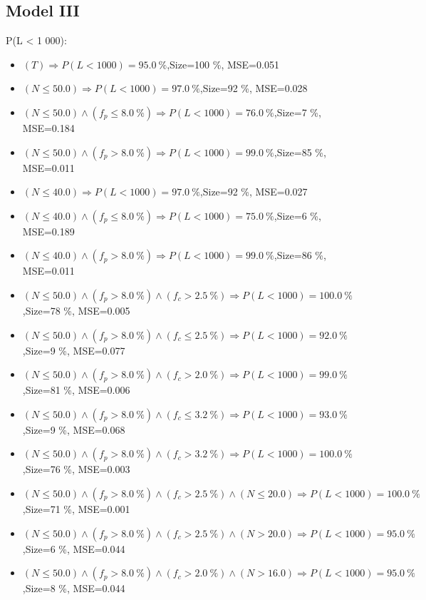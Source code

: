 \documentclass[numbered]{CSL}
\begin{document}
\subsection{Model III}
P(L < 1 000):
\begin{itemize}
\item $(T) \Rightarrow P(L < 1 000) = 95.0~\%$,\hfill Size=100 \%, MSE=0.051
\item $(N \leq 50.0) \Rightarrow P(L < 1 000) = 97.0~\%$,\hfill Size=92 \%, MSE=0.028
\item $(N \leq 50.0) \land (f_p \leq 8.0~\%) \Rightarrow P(L < 1 000) = 76.0~\%$,\hfill Size=7 \%, MSE=0.184
\item $(N \leq 50.0) \land (f_p > 8.0~\%) \Rightarrow P(L < 1 000) = 99.0~\%$,\hfill Size=85 \%, MSE=0.011
\item $(N \leq 40.0) \Rightarrow P(L < 1 000) = 97.0~\%$,\hfill Size=92 \%, MSE=0.027
\item $(N \leq 40.0) \land (f_p \leq 8.0~\%) \Rightarrow P(L < 1 000) = 75.0~\%$,\hfill Size=6 \%, MSE=0.189
\item $(N \leq 40.0) \land (f_p > 8.0~\%) \Rightarrow P(L < 1 000) = 99.0~\%$,\hfill Size=86 \%, MSE=0.011
\item $(N \leq 50.0) \land (f_p > 8.0~\%) \land (f_c > 2.5~\%) \Rightarrow P(L < 1 000) = 100.0~\%$,\hfill Size=78 \%, MSE=0.005
\item $(N \leq 50.0) \land (f_p > 8.0~\%) \land (f_c \leq 2.5~\%) \Rightarrow P(L < 1 000) = 92.0~\%$,\hfill Size=9 \%, MSE=0.077
\item $(N \leq 50.0) \land (f_p > 8.0~\%) \land (f_c > 2.0~\%) \Rightarrow P(L < 1 000) = 99.0~\%$,\hfill Size=81 \%, MSE=0.006
\item $(N \leq 50.0) \land (f_p > 8.0~\%) \land (f_c \leq 3.2~\%) \Rightarrow P(L < 1 000) = 93.0~\%$,\hfill Size=9 \%, MSE=0.068
\item $(N \leq 50.0) \land (f_p > 8.0~\%) \land (f_c > 3.2~\%) \Rightarrow P(L < 1 000) = 100.0~\%$,\hfill Size=76 \%, MSE=0.003
\item $(N \leq 50.0) \land (f_p > 8.0~\%) \land (f_c > 2.5~\%) \land (N \leq 20.0) \Rightarrow P(L < 1 000) = 100.0~\%$,\hfill Size=71 \%, MSE=0.001
\item $(N \leq 50.0) \land (f_p > 8.0~\%) \land (f_c > 2.5~\%) \land (N > 20.0) \Rightarrow P(L < 1 000) = 95.0~\%$,\hfill Size=6 \%, MSE=0.044
\item $(N \leq 50.0) \land (f_p > 8.0~\%) \land (f_c > 2.0~\%) \land (N > 16.0) \Rightarrow P(L < 1 000) = 95.0~\%$,\hfill Size=8 \%, MSE=0.044

\end{itemize}
\end{document}
